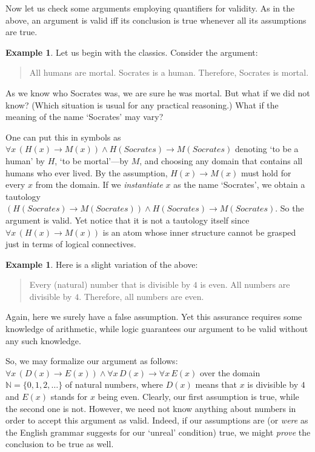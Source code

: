 \documentclass[12pt,notitlepage]{article}
\theoremstyle{plain}
\theoremstyle{definition}
\newtheorem{exm}[thm]{Example}
\theoremstyle{plain}
\newcommand{\N}{\mathbb{N}}
\newcommand{\1}{\mathbf{1}}
\newcommand{\0}{\mathbf{0}}
\newcommand{\mcomm}[1]{}
\begin{document}
Now let us check some arguments employing quantifiers for validity. As in the above, an argument is valid iff its conclusion is true whenever all its assumptions are true.

\begin{exm}
Let us begin with the classics. Consider the argument:
\begin{quote}
All humans are mortal. Socrates is a human. Therefore, Socrates is mortal.
\end{quote}
As we know who Socrates was, we are sure he was mortal. But what if we did not know? (Which situation is usual for any practical reasoning.) What if the meaning of the name `Socrates' may vary?

One can put this in symbols as $\forall x\, (H(x) \to M(x)) \wedge H(Socrates) \to M(Socrates)$ denoting `to be a human' by $H$, `to be mortal'---by $M$, and choosing any domain that contains all humans who ever lived. By the assumption, $H(x) \to M(x)$ must hold for every $x$ from the domain. If we \emph{instantiate} $x$ as the name `Socrates', we obtain a tautology $(H(Socrates) \to M(Socrates)) \wedge H(Socrates) \to M(Socrates)$. So the argument is valid. Yet notice that it is not a tautology itself since $\forall x\, (H(x) \to M(x))$ is an atom whose inner structure cannot be grasped just in terms of logical connectives.
\end{exm}
\mcomm{Logical proofs in these examples should be presented as guided by the natural intuition rather than any formal inference rule. Much like one does for ordinary theorems of `mathematical content'.}

\begin{exm}
Here is a slight variation of the above:
\end{exm}
\begin{quote}
Every (natural) number that is divisible by $4$ is even. All numbers are divisible by $4$. Therefore, all numbers are even.
\end{quote}
Again, here we surely have a false assumption. Yet this assurance requires some knowledge of arithmetic, while logic guarantees our argument to be valid without any such knowledge.

So, we may formalize our argument as follows: $\forall x\, (D(x) \to E(x)) \wedge \forall x\, D(x) \to \forall x\, E(x)$ over the domain $\N = \{0,1,2,\ldots\}$ of natural numbers, where $D(x)$ means that $x$ is divisible by $4$ and $E(x)$ stands for $x$ being even. Clearly, our first assumption is true, while the second one is not. However, we need not know anything about numbers in order to accept this argument as valid. Indeed, if our assumptions are (or \emph{were} as the English grammar suggests for our `unreal' condition) true, we might \emph{prove} the conclusion to be true as well.
\end{document}
